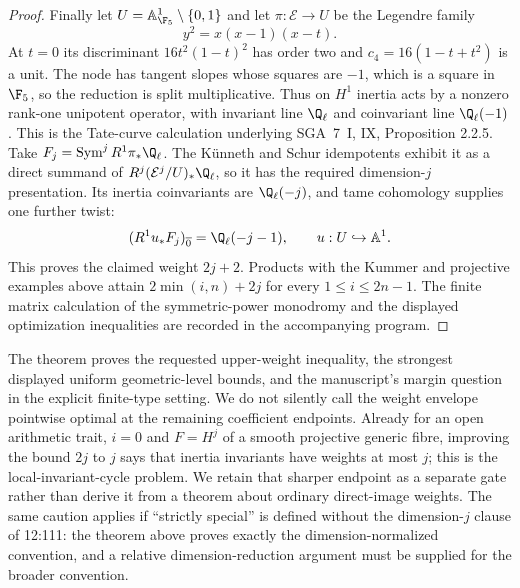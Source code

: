 \begin{proof}
Finally let $U=\mathbb A^1_{\F_5}\setminus\{0,1\}$ and let $\pi:\mathcal E\to U$ be the Legendre family
\[
 y^2=x(x-1)(x-t).
\]
At $t=0$ its discriminant $16t^2(1-t)^2$ has order two and $c_4=16(1-t+t^2)$ is a unit. The node has tangent slopes whose squares are $-1$, which is a square in $\F_5$, so the reduction is split multiplicative. Thus on $H^1$ inertia acts by a nonzero rank-one unipotent operator, with invariant line $\Q_\ell$ and coinvariant line $\Q_\ell(-1)$. This is the Tate-curve calculation underlying SGA~7~I, IX, Proposition 2.2.5. Take $F_j=\operatorname{Sym}^j R^1\pi_*\Q_\ell$. The K\"unneth and Schur idempotents exhibit it as a direct summand of $R^j(\mathcal E^j/U)_*\Q_\ell$, so it has the required dimension-$j$ presentation. Its inertia coinvariants are $\Q_\ell(-j)$, and tame cohomology supplies one further twist:
\[
 (R^1u_*F_j)_{\overline0}=\Q_\ell(-j-1),
 \qquad u:U\hookrightarrow\mathbb A^1.
\]
This proves the claimed weight $2j+2$. Products with the Kummer and projective examples above attain $2\min(i,n)+2j$ for every $1\leq i\leq2n-1$. The finite matrix calculation of the symmetric-power monodromy and the displayed optimization inequalities are recorded in the accompanying program.
\end{proof}

The theorem proves the requested upper-weight inequality, the strongest displayed uniform geometric-level bounds, and the manuscript's margin question in the explicit finite-type setting. We do not silently call the weight envelope pointwise optimal at the remaining coefficient endpoints. Already for an open arithmetic trait, $i=0$ and $F=H^j$ of a smooth projective generic fibre, improving the bound $2j$ to $j$ says that inertia invariants have weights at most $j$; this is the local-invariant-cycle problem. We retain that sharper endpoint as a separate gate rather than derive it from a theorem about ordinary direct-image weights. The same caution applies if ``strictly special'' is defined without the dimension-$j$ clause of 12:111: the theorem above proves exactly the dimension-normalized convention, and a relative dimension-reduction argument must be supplied for the broader convention.
